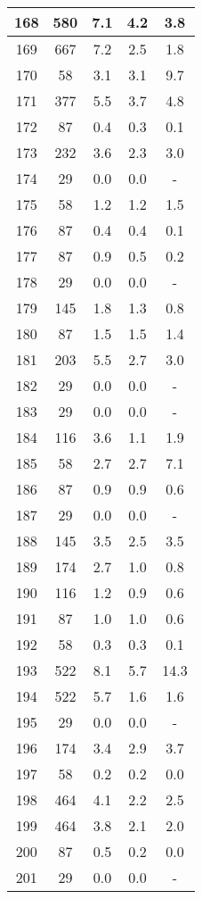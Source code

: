 \documentclass[a4paper,10pt]{article}
\begin{document}
\begin{table}
\begin{tabular}{|c|c|c|c|c|}
\hline
168 & 580 & 7.1 & 4.2 & 3.8 \\
\hline
169 & 667 & 7.2 & 2.5 & 1.8 \\
\hline
170 & 58 & 3.1 & 3.1 & 9.7 \\
\hline
171 & 377 & 5.5 & 3.7 & 4.8 \\
\hline
172 & 87 & 0.4 & 0.3 & 0.1 \\
\hline
173 & 232 & 3.6 & 2.3 & 3.0 \\
\hline
174 & 29 & 0.0 & 0.0 & - \\
\hline
175 & 58 & 1.2 & 1.2 & 1.5 \\
\hline
176 & 87 & 0.4 & 0.4 & 0.1 \\
\hline
177 & 87 & 0.9 & 0.5 & 0.2 \\
\hline
178 & 29 & 0.0 & 0.0 & - \\
\hline
179 & 145 & 1.8 & 1.3 & 0.8 \\
\hline
180 & 87 & 1.5 & 1.5 & 1.4 \\
\hline
181 & 203 & 5.5 & 2.7 & 3.0 \\
\hline
182 & 29 & 0.0 & 0.0 & - \\
\hline
183 & 29 & 0.0 & 0.0 & - \\
\hline
184 & 116 & 3.6 & 1.1 & 1.9 \\
\hline
185 & 58 & 2.7 & 2.7 & 7.1 \\
\hline
186 & 87 & 0.9 & 0.9 & 0.6 \\
\hline
187 & 29 & 0.0 & 0.0 & - \\
\hline
188 & 145 & 3.5 & 2.5 & 3.5 \\
\hline
189 & 174 & 2.7 & 1.0 & 0.8 \\
\hline
190 & 116 & 1.2 & 0.9 & 0.6 \\
\hline
191 & 87 & 1.0 & 1.0 & 0.6 \\
\hline
192 & 58 & 0.3 & 0.3 & 0.1 \\
\hline
193 & 522 & 8.1 & 5.7 & 14.3 \\
\hline
194 & 522 & 5.7 & 1.6 & 1.6 \\
\hline
195 & 29 & 0.0 & 0.0 & - \\
\hline
196 & 174 & 3.4 & 2.9 & 3.7 \\
\hline
197 & 58 & 0.2 & 0.2 & 0.0 \\
\hline
198 & 464 & 4.1 & 2.2 & 2.5 \\
\hline
199 & 464 & 3.8 & 2.1 & 2.0 \\
\hline
200 & 87 & 0.5 & 0.2 & 0.0 \\
\hline
201 & 29 & 0.0 & 0.0 & - \\

\end{tabular}
\end{table}
\end{document}
